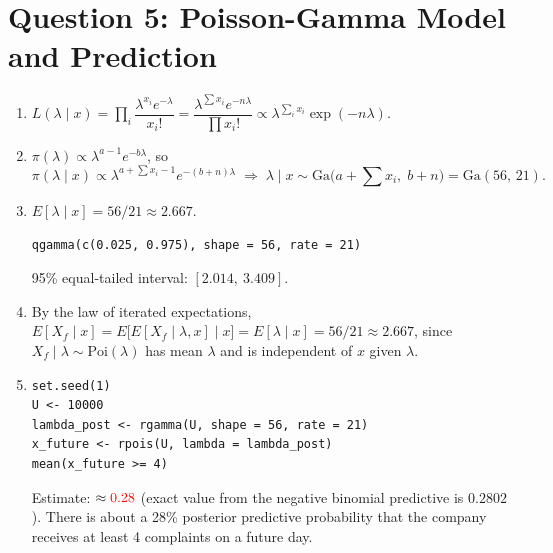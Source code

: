 \documentclass[11pt]{article}
\newcommand{\chk}[1]{{\color{red}#1}}%
\begin{document}
\section*{Question 5: Poisson-Gamma Model and Prediction}
\begin{enumerate}
\item $L(\lambda\mid x)=\prod_i \dfrac{\lambda^{x_i}e^{-\lambda}}{x_i!}=\dfrac{\lambda^{\sum x_i}e^{-n\lambda}}{\prod x_i!}\propto\lambda^{\sum_i x_i}\exp(-n\lambda).$
\item $\pi(\lambda)\propto\lambda^{a-1}e^{-b\lambda}$, so
\[
\pi(\lambda\mid x)\propto\lambda^{a+\sum x_i-1}e^{-(b+n)\lambda}\;\Rightarrow\;\lambda\mid x\sim\mathrm{Ga}\Big(a+\sum x_i,\;b+n\Big)=\mathrm{Ga}(56,\,21).
\]
\item $E[\lambda\mid x]=56/21\approx2.667$.
\begin{lstlisting}
qgamma(c(0.025, 0.975), shape = 56, rate = 21)
\end{lstlisting}
95\% equal-tailed interval: $[2.014,\ 3.409]$.
\item By the law of iterated expectations, $E[X_f\mid x]=E\big[E[X_f\mid\lambda,x]\mid x\big]=E[\lambda\mid x]=56/21\approx2.667$, since $X_f\mid\lambda\sim\mathrm{Poi}(\lambda)$ has mean $\lambda$ and is independent of $x$ given $\lambda$.
\item \begin{lstlisting}
set.seed(1)
U <- 10000
lambda_post <- rgamma(U, shape = 56, rate = 21)
x_future <- rpois(U, lambda = lambda_post)
mean(x_future >= 4)
\end{lstlisting}
Estimate: $\approx\chk{0.28}$ (exact value from the negative binomial predictive is $0.2802$). There is about a 28\% posterior predictive probability that the company receives at least 4 complaints on a future day.
\end{enumerate}
\end{document}
